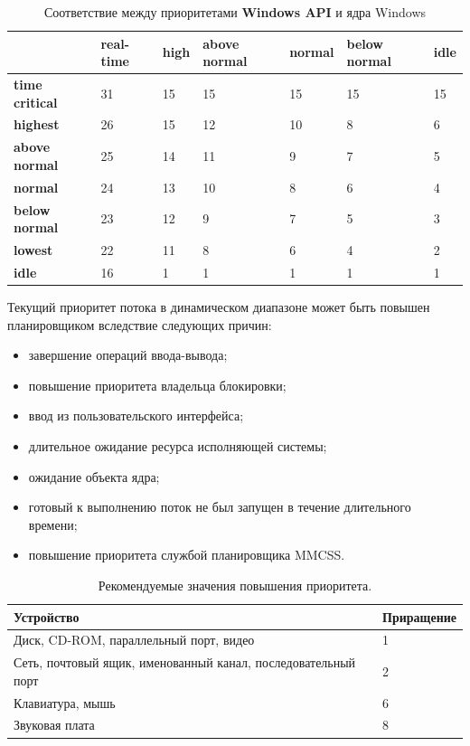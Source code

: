 \begin{table}[h]
	\caption{Соответствие между приоритетами \textbf{Windows API} и ядра Windows}
	\begin{center}
		\begin{tabular}{|l|p{45pt}|p{45pt}|p{45pt}|p{45pt}|p{45pt}|p{45pt}|}
			\hline
			{} & \textbf{real-time} & \textbf{high} & \textbf{above normal} & \textbf{normal} & \textbf{below normal} & \textbf{idle}\\
			\hline
			\textbf{time critical} & 31 & 15 & 15 & 15 & 15 & 15 \\
			\hline
			\textbf{highest} & 26 & 15 & 12 & 10 & 8 & 6 \\
			\hline
			\textbf{above normal} & 25 & 14 & 11 & 9 & 7 & 5 \\
			\hline
			\textbf{normal} & 24 & 13 & 10 & 8 & 6 & 4 \\
			\hline
			\textbf{below normal} & 23 & 12 & 9 & 7 & 5 & 3 \\
			\hline
			\textbf{lowest} & 22 & 11 & 8 & 6 & 4 & 2 \\
			\hline
			\textbf{idle} & 16 & 1 & 1 & 1 & 1 & 1 \\
			\hline
		\end{tabular}
	\end{center}
	\label{tbl:priority}
\end{table}

Текущий приоритет потока в динамическом диапазоне может быть повышен планировщиком вследствие следующих причин:

\begin{itemize}
	\item завершение операций ввода-вывода;
	\item повышение приоритета владельца блокировки;
	\item ввод из пользовательского интерфейса;
	\item длительное ожидание ресурса исполняющей системы;
	\item ожидание объекта ядра;
	\item готовый к выполнению поток не был запущен в течение длительного времени;
	\item повышение приоритета службой планировщика MMCSS.
\end{itemize}

\begin{table}[h!]
	\caption{Рекомендуемые значения повышения приоритета.}
	\begin{center}
		\begin{tabular}{|p{100mm}|l|}
			\hline
			\textbf{Устройство} & \textbf{Приращение} \\
			\hline
			Диск, CD-ROM, параллельный порт, видео & 1 \\
			\hline
			Сеть, почтовый ящик, именованный канал, последовательный порт & 2 \\
			\hline
			Клавиатура, мышь & 6 \\
			\hline
			Звуковая плата & 8 \\
			\hline
		\end{tabular}
	\end{center}
	\label{tab:io}
\end{table}

